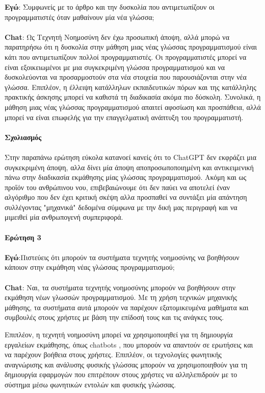 \documentclass{report}
\begin{document}
\textbf{Εγώ}: Συμφωνείς με το άρθρο και την δυσκολία που αντιμετωπίζουν οι προγραμματιστές όταν μαθαίνουν μία νέα γλώσσα;\\\\
\textbf{Chat}: 
Ως Τεχνητή Νοημοσύνη δεν έχω προσωπική άποψη, αλλά μπορώ να παρατηρήσω ότι η δυσκολία στην μάθηση μιας νέας γλώσσας προγραμματισμού είναι κάτι που αντιμετωπίζουν πολλοί προγραμματιστές. Οι προγραμματιστές μπορεί να είναι εξοικειωμένοι με μια συγκεκριμένη γλώσσα προγραμματισμού και να δυσκολεύονται να προσαρμοστούν στα νέα στοιχεία που παρουσιάζονται στην νέα γλώσσα. Επιπλέον, η έλλειψη κατάλληλων εκπαιδευτικών πόρων και της κατάλληλης πρακτικής άσκησης μπορεί να καθιστά τη διαδικασία ακόμα πιο δύσκολη. Συνολικά, η μάθηση μιας νέας γλώσσας προγραμματισμού απαιτεί αφοσίωση και προσπάθεια, αλλά μπορεί να είναι επωφελής για την επαγγελματική ανάπτυξη του προγραμματιστή.\\\\
\textbf{Σχολιασμός}\\\\
Στην παραπάνω ερώτηση εύκολα κατανοεί κανείς ότι το ChatGPT δεν εκφράζει μια συγκεκριμένη άποψη, αλλα δίνει μία άποψη αποπροσωποποιημένη και αντικειμενική πάνω στην διαδικασία εκμάθησης μίας γλώσσας προγραμματισμού. 
Ακόμη και ως προΐόν του ανθρώπινου νου, επιβεβαιώνουμε ότι δεν παύει να αποτελεί έναν αλγόριθμο που δεν έχει κριτική σκέψη αλλα προσπαθεί να συντάξει μία απάντηση συλλέγοντας "μηχανικά" δεδομένα σύμφωνα με την δική μας περιγραφή και να μιμειθεί μία ανθρωπογενή συμπεριφορά.\\\\

\textbf{Ερώτηση 3}\\\\
\textbf{Εγώ}:Πιστεύεις ότι μπορούν τα συστήματα τεχνητής νοημοσύνης να βοηθήσουν κάποιον στην εκμάθηση νέας γλώσσας προγραμματισμού;\\\\
\textbf{Chat}: 
Ναι, τα συστήματα τεχνητής νοημοσύνης μπορούν να βοηθήσουν στην εκμάθηση νέων γλωσσών προγραμματισμού. Με τη χρήση τεχνικών μηχανικής μάθησης, τα συστήματα αυτά μπορούν να παρέχουν εξατομικευμένα μαθήματα και συμβουλές στους χρήστες με βάση την επίδοσή τους και τις ανάγκες τους.

Επιπλέον, η τεχνητή νοημοσύνη μπορεί να χρησιμοποιηθεί για τη δημιουργία εργαλείων εκμάθησης, όπως chatbots , που μπορούν να απαντούν σε ερωτήσεις και να παρέχουν βοήθεια στους χρήστες. Επιπλέον, οι τεχνολογίες φωνητικής αναγνώρισης και ανάλυσης φυσικής γλώσσας μπορούν να χρησιμοποιηθούν για τη δημιουργία εφαρμογών που επιτρέπουν στους χρήστες να αλληλεπιδρούν με το σύστημα μέσω φωνητικών εντολών και φυσικής γλώσσας.
\end{document}
